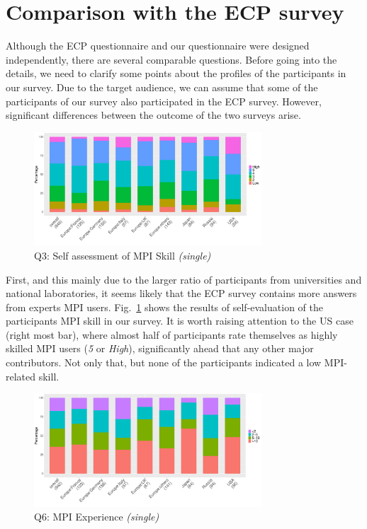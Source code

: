 \documentclass[preprint,5p,times]{elsarticle}
\def\myquote#1{{\it #1}}
\def\mcountries{major contributors\xspace{}}%
\begin{document}
\section{Comparison with the ECP survey}\label{sec:ecp}

Although the ECP questionnaire and our questionnaire were designed
independently, there are several comparable questions. Before going into the
details, we need to clarify some points about the profiles of the participants
in our survey.
%
Due to the target audience, we can assume that some of the participants of our
survey also participated in the ECP survey. However, significant differences
between the outcome of the two surveys arise.

\begin{figure}[htb]
  \begin{center}
    \includegraphics[width=8.5cm]{R-scripts/Q3.pdf}
    \caption{Q3: Self assessment of MPI Skill {\it(single)}}
    \label{fig:mpi-skill}
  \end{center}
\end{figure}

First, and this mainly due to the larger ratio of participants from universities
and national laboratories, it seems likely that the ECP survey contains more
answers from experts MPI users.
Fig.~\ref{fig:mpi-skill} shows the results of self-evaluation of the
participants MPI skill in our survey.  It is worth raising attention to the US
case (right most bar), where almost half of participants rate themselves as
highly skilled MPI users (\myquote{5} or \myquote{High}), significantly ahead
that any other \mcountries. Not only that, but none of the participants
indicated a low MPI-related skill.

\begin{figure}[htb]
  \begin{center}
    \includegraphics[width=8.5cm]{R-scripts/Q6.pdf}
    \caption{Q6: MPI Experience {\it(single)}}
    \label{fig:mpi-experience}
  \end{center}
\end{figure}
\end{document}
